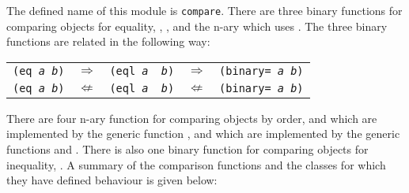 %
\begin{optDefinition}
%
The defined name of this module is {\tt compare}.  There are three binary
functions for comparing objects for equality, ,
,  and the n-ary \functionref{=} which uses
.  The three binary functions are related in the following
way:
%
\begin{center}
\begin{tabular}{rcccl}
    {\tt (eq {\em a} {\em b})} & $\Rightarrow$ & {\tt (eql {\em a} {\em
            b})} & $\Rightarrow$ & {\tt (binary= {\em a} {\em b})}\\
    {\tt (eq {\em a} {\em b})} & $\not\Leftarrow$ & {\tt (eql {\em a} {\em
            b})} & $\not\Leftarrow$ & {\tt (binary= {\em a} {\em b})}\\
\end{tabular}
\end{center}
%
There are four n-ary function for comparing objects by order, \functionref{<}
and \functionref{>} which are implemented by the generic function
, \functionref{<=} and \functionref{>=} which are
implemented by the generic functions  and
.  There is also one binary function for comparing objects
for inequality, \functionref{!=}.  A summary of the comparison functions and the
classes for which they have defined behaviour is given below:


\end{optDefinition}
